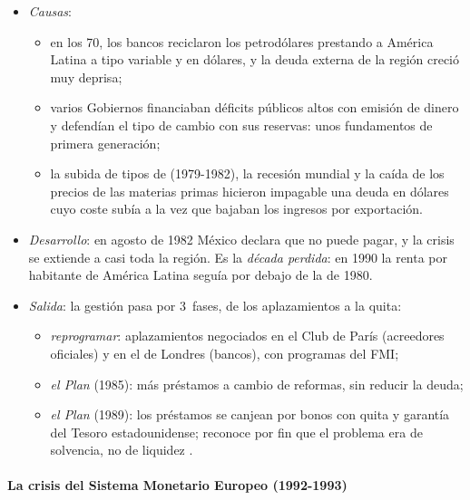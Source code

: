 \documentclass[11pt]{article}
\begin{document}
\begin{itemize}
\item \emph{Causas}:
  \begin{itemize}
  \item en los 70, los bancos reciclaron los petrodólares prestando a América Latina a tipo variable y en dólares, y la deuda externa de la región creció muy deprisa;
  \item varios Gobiernos financiaban déficits públicos altos con emisión de dinero y defendían el tipo de cambio con sus reservas: unos fundamentos de primera generación;
  \item la subida de tipos de  (1979-1982), la recesión mundial y la caída de los precios de las materias primas hicieron impagable una deuda en dólares cuyo coste subía a la vez que bajaban los ingresos por exportación.
  \end{itemize}
\item \emph{Desarrollo}: en agosto de 1982 México declara que no puede pagar, y la crisis se extiende a casi toda la región. Es la \emph{década perdida}: en 1990 la renta por habitante de América Latina seguía por debajo de la de 1980.
\item \emph{Salida}: la gestión pasa por 3~fases, de los aplazamientos a la quita:
  \begin{itemize}
  \item \emph{reprogramar}: aplazamientos negociados en el Club de París (acreedores oficiales) y en el de Londres (bancos), con programas del FMI;
  \item \emph{el Plan } (1985): más préstamos a cambio de reformas, sin reducir la deuda;
  \item \emph{el Plan } (1989): los préstamos se canjean por bonos con quita y garantía del Tesoro estadounidense; reconoce por fin que el problema era de solvencia, no de liquidez\nocite{FMI2023Brady} .
  \end{itemize}
\end{itemize}

\paragraph{La crisis del Sistema Monetario Europeo (1992-1993)}
\end{document}

